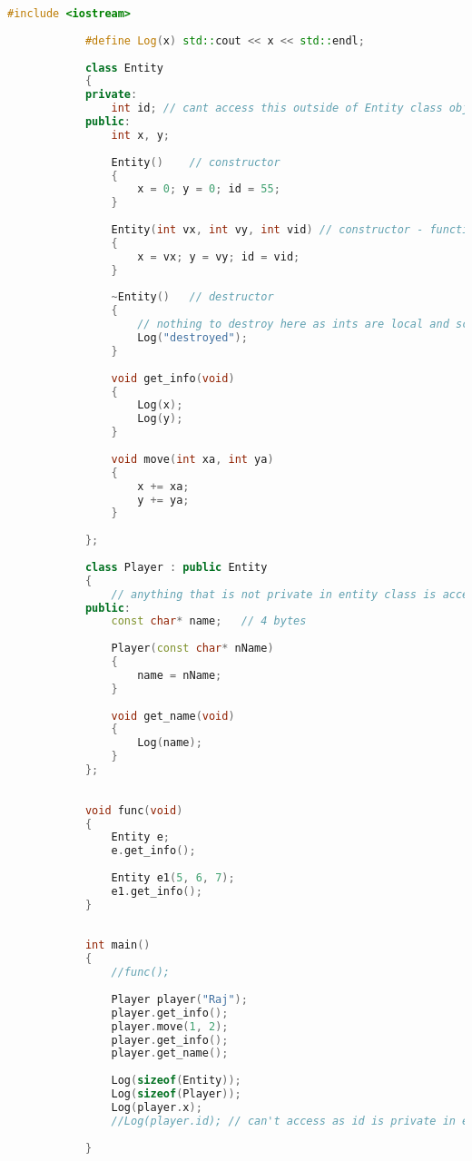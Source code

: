 \documentclass{article}
\begin{document}
        \begin{lstlisting}[language=C++, caption=Inheritance example]
            #include <iostream>
            
            #define Log(x) std::cout << x << std::endl;
            
            class Entity
            {
            private:
            	int id;	// cant access this outside of Entity class objects
            public:
            	int x, y;
            
            	Entity()	// constructor
            	{
            		x = 0; y = 0; id = 55;
            	}
            
            	Entity(int vx, int vy, int vid)	// constructor - function overloading
            	{
            		x = vx; y = vy; id = vid;
            	}
            
            	~Entity()	// destructor
            	{
            		// nothing to destroy here as ints are local and scope is limited.
            		Log("destroyed");
            	}
            
            	void get_info(void)
            	{
            		Log(x);
            		Log(y);
            	}
            
            	void move(int xa, int ya)
            	{
            		x += xa;
            		y += ya;
            	}
            
            };
            
            class Player : public Entity
            {
            	// anything that is not private in entity class is accessible by player
            public:
            	const char* name;	// 4 bytes
            
            	Player(const char* nName)
            	{
            		name = nName;
            	}
            
            	void get_name(void)
            	{
            		Log(name);
            	}
            };
            
            
            void func(void)
            {
            	Entity e;
            	e.get_info();
            
            	Entity e1(5, 6, 7);
            	e1.get_info();
            }
            
            
            int main()
            {
            	//func();
            
            	Player player("Raj");
            	player.get_info();
            	player.move(1, 2);
            	player.get_info();
            	player.get_name();
            
            	Log(sizeof(Entity));
            	Log(sizeof(Player));
            	Log(player.x);
            	//Log(player.id); // can't access as id is private in entity
            	
            }
        \end{lstlisting}
        
\end{document}
